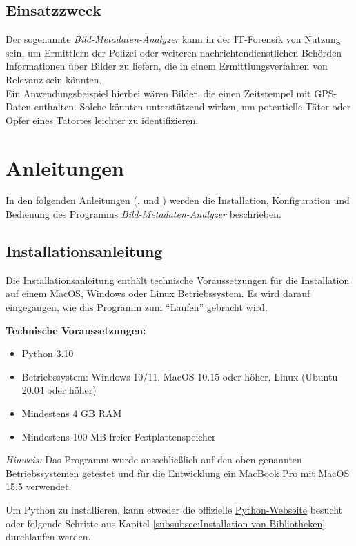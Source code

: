 \documentclass{Bild-Metadaten-Analyzer}
\begin{document}
\subsection{Einsatzzweck}\label{subsec:Einsatzzweck}
Der sogenannte \textit{Bild-Metadaten-Analyzer} kann in der IT-Forensik von Nutzung sein, um Ermittlern der Polizei oder weiteren
nachrichtendienstlichen Behörden Informationen über Bilder zu liefern, die in einem Ermittlungsverfahren von Relevanz sein könnten.
\\Ein Anwendungsbeispiel hierbei wären Bilder, die einen Zeitstempel mit GPS-Daten enthalten. Solche könnten unterstützend wirken, 
um potentielle Täter oder Opfer eines Tatortes leichter zu identifizieren.
\clearpage

\section{Anleitungen}\label{sec:Anleitungen}
In den folgenden Anleitungen (,  und 
) werden die Installation, Konfiguration und Bedienung des Programms 
\textit{Bild-Metadaten-Analyzer} beschrieben.

\subsection{Installationsanleitung}\label{subsec:Installationsanleitung}
Die Installationsanleitung enthält technische Voraussetzungen für die Installation auf einem MacOS, Windows oder Linux Betriebssystem. 
Es wird darauf eingegangen, wie das Programm zum ``Laufen'' gebracht wird.

\textbf{Technische Voraussetzungen:}
\begin{itemize}
	\item Python 3.10
	\item Betriebssystem: Windows 10/11, MacOS 10.15 oder höher, Linux (Ubuntu 20.04 oder höher)
	\item Mindestens 4 GB RAM
	\item Mindestens 100 MB freier Festplattenspeicher
\end{itemize}

\textit{Hinweis:} Das Programm wurde ausschließlich auf den oben genannten Betriebssystemen getestet und für die Entwicklung 
ein MacBook Pro mit MacOS 15.5 verwendet.

Um Python zu installieren, kann etweder die offizielle \href{https://www.python.org/downloads/}{Python-Webseite} besucht  
oder folgende Schritte aus Kapitel \ref{subsubsec:Installation von Bibliotheken}  
durchlaufen werden.
\end{document}
